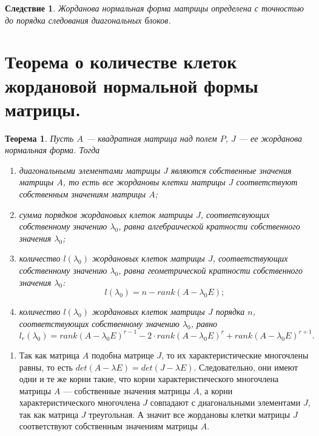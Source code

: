 \newtheorem*{cor12_8_3}{Следствие}\begin{cor12_8_3}Жорданова нормальная форма матрицы определена с точностью до порядка следования диагональных блоков.
\end{cor12_8_3}













\section{Теорема о количестве клеток жордановой нормальной формы матрицы.}

\newtheorem*{th12_9}{Теорема}\begin{th12_9}Пусть $A$ --- квадратная матрица над полем $P$, $J$ --- ее жорданова нормальная форма. Тогда\begin{enumerate}
		\item диагональными элементами матрицы $J$ являются собственные значения матрицы $A$, то есть все жордановы клетки матрицы $J$ соответствуют собственным значениям матрицы $A$;
		\item сумма порядков жордановых клеток матрицы $J$, соответсвующих собственному значению $\lambda_0$, равна алгебраической кратности собственного значения $\lambda_0$;
		\item количество $l(\lambda_0)$ жордановых клеток матрицы $J$, соответствующих собственному значению $\lambda_0$, равна геометрической кратности собственного значения $\lambda_0$: $$l(\lambda_0) = n - rank(A - \lambda_0 E);$$
		\item количество $l(\lambda_0)$ жордановых клеток матрицы $J$ порядка $n$, соответствующих собственному значению $\lambda_0$, равно $$l_r(\lambda_0) = rank(A - \lambda_0 E)^{r - 1} - 2\cdot rank(A - \lambda_0 E)^{r} + rank(A - \lambda_0 E)^{r + 1}.$$
	\end{enumerate}
\end{th12_9}\begin{Proof}\begin{enumerate}
		\item Так как матрица $A$ подобна матрице $J$, то их характеристические многочлены равны, то есть $det(A - \lambda E) = det(J - \lambda E)$. Следовательно, они имеют одни и те же корни такие, что корни характеристического многочлена матрицы $A$ --- собственные значения матрицы $A$, а корни характеристического многочлена $J$ совпадают с диагональными элементами $J$, так как матрица $J$ треугольная. А значит все жордановы клетки матрицы $J$ соответствуют собственным значениям матрицы $A$.

\end{enumerate}
\end{Proof}

